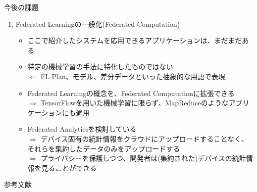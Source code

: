 \documentclass[dvipdfmx,notheorems,t]{beamer}
\begin{document}
\begin{frame}{今後の課題}
\begin{enumerate}
	\framebreak
	
	\item Federated Learningの一般化(Federated Computation)
	\begin{itemize}
		\item ここで紹介したシステムを応用できるアプリケーションは、まだまだある
		\newline
		
		\item 特定の機械学習の手法に特化したものではない \\
		$\Leftarrow$ FL Plan、モデル、差分データといった抽象的な用語で表現
		\newline
		
		\item Federated Learningの概念を、Federated Computationに拡張できる \\
		$\Rightarrow$ TensorFlowを用いた機械学習に限らず、MapReduceのようなアプリケーションにも適用
		\newline
		
		\item Federated Analyticsを検討している \\
		$\Rightarrow$ デバイス固有の統計情報をクラウドにアップロードすることなく、それらを集約したデータのみをアップロードする \\
		$\Rightarrow$ プライバシーを保護しつつ、開発者は(集約された)デバイスの統計情報を見ることができる
	\end{itemize}
\end{enumerate}

\end{frame}

\begin{frame}{参考文献}




\end{frame}
\end{document}
